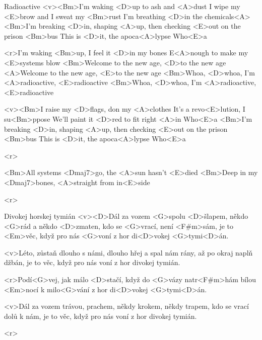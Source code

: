 \begin{song}{74}{Radioactive}{}
	<v><Bm>I'm waking <D>up to ash and <A>dust
	I wipe my <E>brow and I sweat my <Bm>rust
	I'm breathing <D>in the chemicals<A>
	<Bm>I'm breaking <D>in, shaping <A>up, then checking <E>out on the prison <Bm>bus
	This is <D>it, the apoca<A>lypse
	Who<E>a

	<r>I'm waking <Bm>up, I feel it <D>in my bones
	E<A>nough to make my <E>systems blow
	<Bm>Welcome to the new age, <D>to the new age
	<A>Welcome to the new age, <E>to the new age
	<Bm>Whoa, <D>whoa, I'm <A>radioactive, <E>radioactive
	<Bm>Whoa, <D>whoa, I'm <A>radioactive, <E>radioactive

	<v><Bm>I raise my <D>flags, don my <A>clothes
	It's a revo<E>lution, I su<Bm>ppose
	We'll paint it <D>red to fit right <A>in
	Who<E>a
	<Bm>I'm breaking <D>in, shaping <A>up, then checking <E>out on the prison <Bm>bus
	This is <D>it, the apoca<A>lypse
	Who<E>a

	<r>

	<Bm>All systems <Dmaj7>go, the <A>sun hasn't <E>died
	<Bm>Deep in my <Dmaj7>bones, <A>straight from in<E>side

	<r>
\end{song}

\begin{song}{75}{Divokej horskej tymián}{}
	<v><D>Dál za vozem <G>spolu <D>šlapem,
	někdo <G>rád a někdo <D>zmaten,
	kdo se <G>vrací, není <F#m>sám,
	je to <Em>věc, když pro nás <G>voní
	z hor di<D>vokej <G>tymi<D>án.

	<v>Léto, zůstaň dlouho s námi,
	dlouho hřej a spal nám rány,
	až po okraj naplň džbán,
	je to věc, když pro nás voní
	z hor divokej tymián.

	<r>Podí<G>vej, jak málo <D>stačí, když do <G>vázy natr<F#m>hám
	bílou <Em>nocí k milo<G>vání z hor di<D>vokej <G>tymi<D>án.

	<v>Dál za vozem trávou, prachem,
	někdy krokem, někdy trapem,
	kdo se vrací dolů k nám,
	je to věc, když pro nás voní
	z hor divokej tymián.

	<r>
\end{song}

